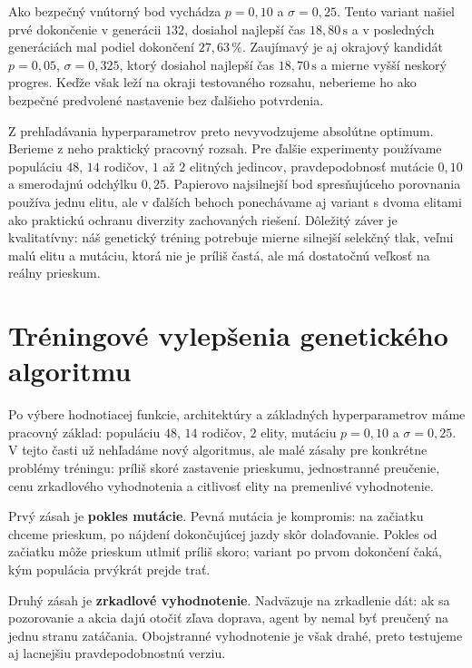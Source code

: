Ako bezpečný vnútorný bod vychádza \(p=0{,}10\) a \(\sigma=0{,}25\). Tento variant našiel prvé dokončenie v generácii \(132\), dosiahol najlepší čas \(18{,}80\,\mathrm{s}\) a v posledných generáciách mal podiel dokončení \(27{,}63\,\%\). Zaujímavý je aj okrajový kandidát \(p=0{,}05\), \(\sigma=0{,}325\), ktorý dosiahol najlepší čas \(18{,}70\,\mathrm{s}\) a mierne vyšší neskorý progres. Keďže však leží na okraji testovaného rozsahu, neberieme ho ako bezpečné predvolené nastavenie bez ďalšieho potvrdenia.

Z prehľadávania hyperparametrov preto nevyvodzujeme absolútne optimum. Berieme z neho praktický pracovný rozsah. Pre ďalšie experimenty používame populáciu \(48\), \(14\) rodičov, \(1\) až \(2\) elitných jedincov, pravdepodobnosť mutácie \(0{,}10\) a smerodajnú odchýlku \(0{,}25\). Papierovo najsilnejší bod spresňujúceho porovnania používa jednu elitu, ale v ďalších behoch ponechávame aj variant s dvoma elitami ako praktickú ochranu diverzity zachovaných riešení. Dôležitý záver je kvalitatívny: náš genetický tréning potrebuje mierne silnejší selekčný tlak, veľmi malú elitu a mutáciu, ktorá nie je príliš častá, ale má dostatočnú veľkosť na reálny prieskum.

\FloatBarrier

\section{Tréningové vylepšenia genetického algoritmu}

Po výbere hodnotiacej funkcie, architektúry a základných hyperparametrov máme pracovný základ: populáciu \(48\), \(14\) rodičov, \(2\) elity, mutáciu \(p=0{,}10\) a \(\sigma=0{,}25\). V tejto časti už nehľadáme nový algoritmus, ale malé zásahy pre konkrétne problémy tréningu: príliš skoré zastavenie prieskumu, jednostranné preučenie, cenu zrkadlového vyhodnotenia a citlivosť elity na premenlivé vyhodnotenie.

Prvý zásah je \textbf{pokles mutácie}. Pevná mutácia je kompromis: na začiatku chceme prieskum, po nájdení dokončujúcej jazdy skôr dolaďovanie. Pokles od začiatku môže prieskum utlmiť príliš skoro; variant po prvom dokončení čaká, kým populácia prvýkrát prejde trať.

Druhý zásah je \textbf{zrkadlové vyhodnotenie}. Nadväzuje na zrkadlenie dát: ak sa pozorovanie a akcia dajú otočiť zľava doprava, agent by nemal byť preučený na jednu stranu zatáčania. Obojstranné vyhodnotenie je však drahé, preto testujeme aj lacnejšiu pravdepodobnostnú verziu.

